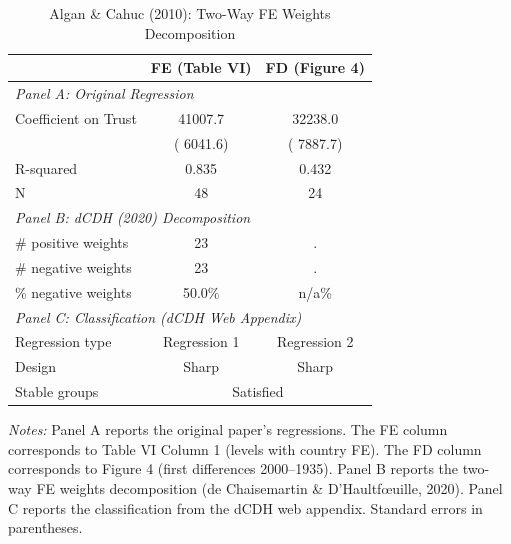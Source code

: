 \begin{table}[htbp]
\centering
\caption{Algan \& Cahuc (2010): Two-Way FE Weights Decomposition}
\label{tab:algan_twfe}
\begin{tabular}{lcc}
\toprule
 & FE (Table VI) & FD (Figure 4) \\
\midrule
\multicolumn{3}{l}{\textit{Panel A: Original Regression}} \\[3pt]
Coefficient on Trust &   41007.7 &   32238.0 \\
 & (    6041.6) & (    7887.7) \\
R-squared &0.835 &0.432 \\
N & 48 & 24 \\[6pt]
\multicolumn{3}{l}{\textit{Panel B: dCDH (2020) Decomposition}} \\[3pt]
\# positive weights &  23 &   . \\
\# negative weights &  23 &   . \\
\% negative weights &  50.0\% & n/a\% \\[6pt]
\multicolumn{3}{l}{\textit{Panel C: Classification (dCDH Web Appendix)}} \\[3pt]
Regression type & Regression 1 & Regression 2 \\
Design & Sharp & Sharp \\
Stable groups & \multicolumn{2}{c}{Satisfied} \\
\bottomrule
\end{tabular}

\vspace{6pt}
\begin{minipage}{0.9\textwidth}
\footnotesize
\textit{Notes:} Panel A reports the original paper's regressions. 
The FE column corresponds to Table VI Column 1 (levels with country FE). 
The FD column corresponds to Figure 4 (first differences 2000--1935). 
Panel B reports the two-way FE weights decomposition 
(de Chaisemartin \& D'Haultf\oe uille, 2020). 
Panel C reports the classification from the dCDH web appendix. 
Standard errors in parentheses.
\end{minipage}
\end{table}
